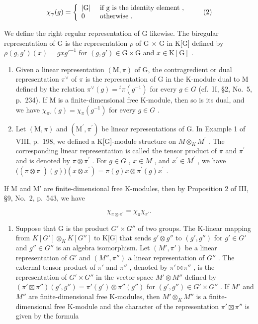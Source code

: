 \[
\chi_ {\boldsymbol {\gamma}} (g) = \left\{ \begin{array}{l l} | \mathrm{G} | & \text { if   g   is   the   identity   element }, \\ 0 & \text { otherwise }. \end{array} \right.\tag{2}
\]

We define the right regular representation of G likewise. The biregular representation of G is the representation \(\rho\) of G × G in K{[}G{]} defined by \(\rho(g, g')(x) = gxg'^{-1}\) for \((g, g') \in \mathrm{G} \times \mathrm{G}\) and \(x \in \mathrm{K}[\mathrm{G}]\) .

\begin{enumerate}
\def\labelenumi{\arabic{enumi})}
\setcounter{enumi}{2}
\item
  Given a linear representation \((\mathrm{M},\pi)\) of G, the contragredient or dual representation \(\pi^{\vee}\) of \(\pi\) is the representation of G in the K-module dual to M defined by the relation \(\pi^{\vee}(g)={}^{t}\pi(g^{-1})\) for every \(g\in G\) (cf.~II, §2, No.~5, p.~234). If M is a finite-dimensional free K-module, then so is its dual, and we have \(\chi_{\pi^{\vee}}(g)=\chi_{\pi}(g^{-1})\) for every \(g\in G\) .
\item
  Let \((\mathrm{M},\pi)\) and \((\mathrm{M}^{\prime},\pi^{\prime})\) be linear representations of G. In Example 1 of VIII, p.~198, we defined a K{[}G{]}-module structure on \(M\otimes_{K}M^{\prime}\) . The corresponding linear representation is called the tensor product of \(\pi\) and \(\pi^{\prime}\) and is denoted by \(\pi\otimes\pi^{\prime}\) . For \(g\in G\) , \(x\in M\) , and \(x^{\prime}\in M^{\prime}\) , we have \(\big((\pi\otimes\pi^{\prime})(g)\big)(x\otimes x^{\prime})=\pi(g)x\otimes\pi^{\prime}(g)x^{\prime}\) .
\end{enumerate}

If M and M' are finite-dimensional free K-modules, then by Proposition 2 of III, §9, No.~2, p.~543, we have

\[
\chi_ {\pi \otimes \pi^ {\prime}} = \chi_ {\pi} \chi_ {\pi^ {\prime}}.\tag{3}
\]

\begin{enumerate}
\def\labelenumi{\arabic{enumi})}
\setcounter{enumi}{4}
\tightlist
\item
  Suppose that G is the product \(G' \times G''\) of two groups. The K-linear mapping from \(K[G'] \otimes_{K} K[G'']\) to K{[}G{]} that sends \(g' \otimes g''\) to \((g', g'')\) for \(g' \in G'\) and \(g'' \in G''\) is an algebra isomorphism. Let \((M', \pi')\) be a linear representation of \(G'\) and \((M'', \pi'')\) a linear representation of \(G''\) . The external tensor product of \(\pi'\) and \(\pi''\) , denoted by \(\pi' \boxtimes \pi''\) , is the representation of \(G' \times G''\) in the vector space \(M' \otimes M''\) defined by \((\pi' \boxtimes \pi'')(g', g'') = \pi'(g') \otimes \pi''(g'')\) for \((g', g'') \in G' \times G''\) . If \(M'\) and \(M''\) are finite-dimensional free K-modules, then \(M' \otimes_{K} M''\) is a finite-dimensional free K-module and the character of the representation \(\pi' \boxtimes \pi''\) is given by the formula
\end{enumerate}

